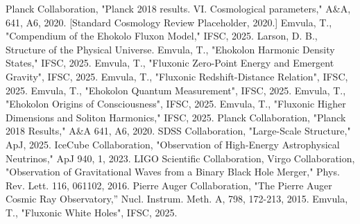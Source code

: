 \documentclass[11pt]{article}
\begin{document}

\begin{thebibliography}{99}

     Planck Collaboration, "Planck 2018 results. VI. Cosmological parameters," A\&A, 641, A6, 2020.
     [Standard Cosmology Review Placeholder, 2020.]
     Emvula, T., "Compendium of the Ehokolo Fluxon Model," IFSC, 2025.
     Larson, D. B., Structure of the Physical Universe.
     Emvula, T., "Ehokolon Harmonic Density States," IFSC, 2025.
     Emvula, T., "Fluxonic Zero-Point Energy and Emergent Gravity", IFSC, 2025.
     Emvula, T., "Fluxonic Redshift-Distance Relation", IFSC, 2025.
     Emvula, T., "Ehokolon Quantum Measurement", IFSC, 2025.
     Emvula, T., "Ehokolon Origins of Consciousness", IFSC, 2025.
     Emvula, T., "Fluxonic Higher Dimensions and Soliton Harmonics," IFSC, 2025.
     Planck Collaboration, "Planck 2018 Results," A\&A 641, A6, 2020.
     SDSS Collaboration, "Large-Scale Structure," ApJ, 2025.
     IceCube Collaboration, "Observation of High-Energy Astrophysical Neutrinos," ApJ 940, 1, 2023.
     LIGO Scientific Collaboration, Virgo Collaboration, "Observation of Gravitational Waves from a Binary Black Hole Merger," Phys. Rev. Lett. 116, 061102, 2016.
     Pierre Auger Collaboration, "The Pierre Auger Cosmic Ray Observatory,” Nucl. Instrum. Meth. A, 798, 172-213, 2015.
     Emvula, T., "Fluxonic White Holes", IFSC, 2025.

\end{thebibliography}
\end{document}
